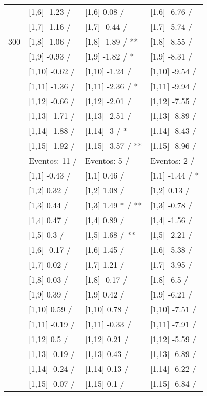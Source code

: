 \begin{table}
\begin{tabular}[t]{llll}
 & {}[1,6] -1.23  / & {}[1,6] 0.08  / & {}[1,6] -6.76  /\\
 & {}[1,7] -1.16  / & {}[1,7] -0.44  / & {}[1,7] -5.74  /\\
300 & {}[1,8] -1.06  / & {}[1,8] -1.89  / ** & {}[1,8] -8.55  /\\
\addlinespace
 & {}[1,9] -0.93  / & {}[1,9] -1.82  / * & {}[1,9] -8.31  /\\
 & {}[1,10] -0.62  / & {}[1,10] -1.24  / & {}[1,10] -9.54  /\\
 & {}[1,11] -1.36  / & {}[1,11] -2.36  / * & {}[1,11] -9.94  /\\
 & {}[1,12] -0.66  / & {}[1,12] -2.01  / & {}[1,12] -7.55  /\\
 & {}[1,13] -1.71  / & {}[1,13] -2.51  / & {}[1,13] -8.89  /\\
\addlinespace
 & {}[1,14] -1.88  / & {}[1,14] -3  / * & {}[1,14] -8.43  /\\
 & {}[1,15] -1.92  / & {}[1,15] -3.57  / ** & {}[1,15] -8.96  /\\
 & Eventos:  11 / & Eventos:  5 / & Eventos:  2 /\\
 & {}[1,1] -0.43  / & {}[1,1] 0.46  / & {}[1,1] -1.44  / *\\
 & {}[1,2] 0.32  / & {}[1,2] 1.08  / & {}[1,2] 0.13  /\\
\addlinespace
 & {}[1,3] 0.44  / & {}[1,3] 1.49 * / ** & {}[1,3] -0.78  /\\
 & {}[1,4] 0.47  / & {}[1,4] 0.89  / & {}[1,4] -1.56  /\\
 & {}[1,5] 0.3  / & {}[1,5] 1.68  / ** & {}[1,5] -2.21  /\\
 & {}[1,6] -0.17  / & {}[1,6] 1.45  / & {}[1,6] -5.38  /\\
 & {}[1,7] 0.02  / & {}[1,7] 1.21  / & {}[1,7] -3.95  /\\
\addlinespace
500 & {}[1,8] 0.03  / & {}[1,8] -0.17  / & {}[1,8] -6.5  /\\
 & {}[1,9] 0.39  / & {}[1,9] 0.42  / & {}[1,9] -6.21  /\\
 & {}[1,10] 0.59  / & {}[1,10] 0.78  / & {}[1,10] -7.51  /\\
 & {}[1,11] -0.19  / & {}[1,11] -0.33  / & {}[1,11] -7.91  /\\
 & {}[1,12] 0.5  / & {}[1,12] 0.21  / & {}[1,12] -5.59  /\\
\addlinespace
 & {}[1,13] -0.19  / & {}[1,13] 0.43  / & {}[1,13] -6.89  /\\
 & {}[1,14] -0.24  / & {}[1,14] 0.13  / & {}[1,14] -6.22  /\\
 & {}[1,15] -0.07  / & {}[1,15] 0.1  / & {}[1,15] -6.84  /\\
\bottomrule
\end{tabular}
\end{table}

